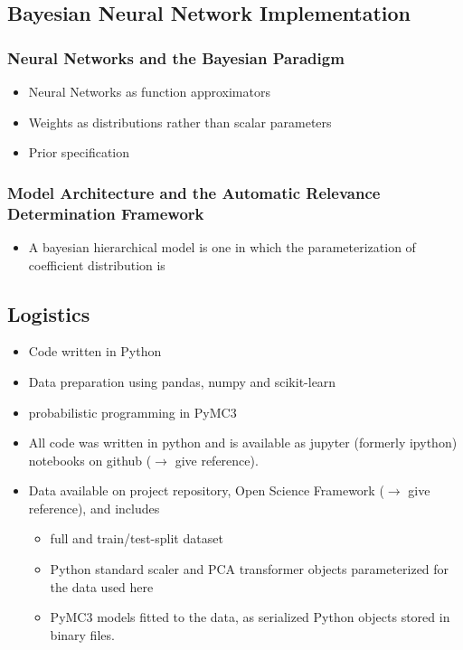 \documentclass[10pt,a4paper]{article}
\begin{document}
		\subsection{Bayesian Neural Network Implementation}
			\subsubsection{Neural Networks and the Bayesian Paradigm}
				\begin{itemize}
					\item Neural Networks as function approximators
					\item Weights as distributions rather than scalar parameters
					\item Prior specification
				\end{itemize}
			\subsubsection{Model Architecture and the Automatic Relevance Determination Framework}
				\begin{itemize}
				    \item A bayesian hierarchical model is one in which the parameterization of coefficient distribution is
				\end{itemize}
		\subsection{Logistics}
		    \begin{itemize}
		        \item Code written in Python
		        \item Data preparation using pandas, numpy and scikit-learn
		        \item probabilistic programming in PyMC3
	            \item All code was written in python and is available as jupyter (formerly ipython) notebooks on github ($\rightarrow$ give reference). 
	            \item Data available on project repository, Open Science Framework ($\rightarrow$ give reference), and includes
	            \begin{itemize}
	                \item full and train/test-split dataset
	                \item Python standard scaler and PCA transformer objects parameterized for the data used here
	                \item PyMC3 models fitted to the data, as serialized Python objects stored in binary files.
    	        \end{itemize}
	       \end{itemize}
	\newpage
\end{document}
